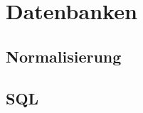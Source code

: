 \section{Datenbanken}
\label{sec:Datenbanken}



\subsection{Normalisierung}
\label{sec:Normalisierung}

\subsection{SQL}
\label{sec:SQL}